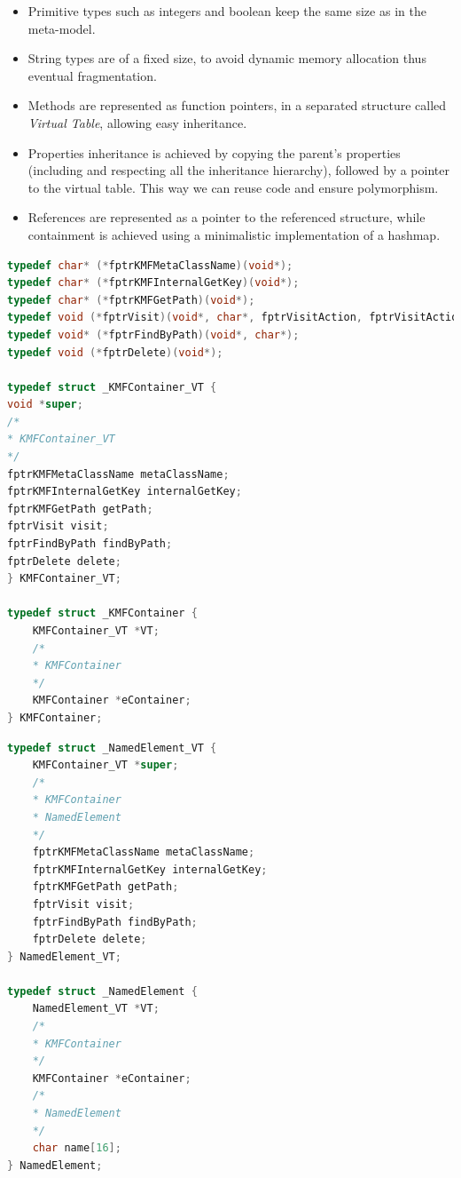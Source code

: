 \begin{itemize}
	\item Primitive types such as integers and boolean keep the same size as in the meta-model.
	\item String types are of a fixed size, to avoid dynamic memory allocation thus eventual fragmentation.
	\item Methods are represented as function pointers, in a separated structure called \textit{Virtual Table}, allowing easy inheritance.
	\item Properties inheritance is achieved by copying the parent's properties (including and respecting all the inheritance hierarchy), followed by a pointer to the virtual table. This way we can reuse code and ensure polymorphism.
	\item References are represented as a pointer to the referenced structure, while containment is achieved using a minimalistic implementation of a hashmap.
\end{itemize}


\begin{lstlisting}[language=C, caption=KMFContainer: the main container on Kevoree, label=lst:KMFContainer]
typedef char* (*fptrKMFMetaClassName)(void*);
typedef char* (*fptrKMFInternalGetKey)(void*);
typedef char* (*fptrKMFGetPath)(void*);
typedef void (*fptrVisit)(void*, char*, fptrVisitAction, fptrVisitActionRef, bool);
typedef void* (*fptrFindByPath)(void*, char*);
typedef void (*fptrDelete)(void*);

typedef struct _KMFContainer_VT {
void *super;
/*
* KMFContainer_VT
*/
fptrKMFMetaClassName metaClassName;
fptrKMFInternalGetKey internalGetKey;
fptrKMFGetPath getPath;
fptrVisit visit;
fptrFindByPath findByPath;
fptrDelete delete;
} KMFContainer_VT;

typedef struct _KMFContainer {
    KMFContainer_VT *VT;
    /*
    * KMFContainer
    */
    KMFContainer *eContainer;
} KMFContainer;
\end{lstlisting}

\begin{lstlisting}[language=C, caption=NamedElement class representation inheriting from KMFContainer, label=lst:NamedElement]
typedef struct _NamedElement_VT {
    KMFContainer_VT *super;
    /*
    * KMFContainer
    * NamedElement
    */
    fptrKMFMetaClassName metaClassName;
    fptrKMFInternalGetKey internalGetKey;
    fptrKMFGetPath getPath;
    fptrVisit visit;
    fptrFindByPath findByPath;
    fptrDelete delete;
} NamedElement_VT;

typedef struct _NamedElement {
    NamedElement_VT *VT;
    /*
    * KMFContainer
    */
    KMFContainer *eContainer;
    /*
    * NamedElement
    */
    char name[16];
} NamedElement;
\end{lstlisting}


